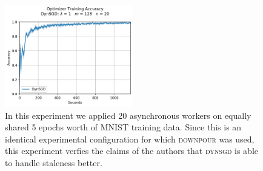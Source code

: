 \begin{figure}[H]
  \centering
  \includegraphics[width=0.5\textwidth]{resources/images/dynsgd_20}
  \caption{In this experiment we applied 20 asynchronous workers on equally shared 5 epochs worth of MNIST training data. Since this is an identical experimental configuration for which \textsc{downpour} was used, this experiment verfies the claims of the authors that \textsc{dynsgd} is able to handle staleness better.}
  \label{fig:dynsgd_downpour_fail}
\end{figure}

